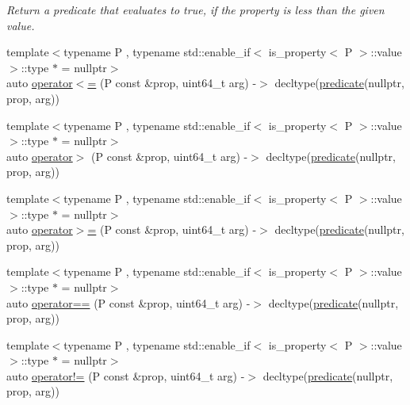 \begin{DoxyCompactItemize}
\begin{DoxyCompactList}\small\item\em Return a predicate that evaluates to {\ttfamily true}, if the property is less than the given value. \end{DoxyCompactList}\item 
{\footnotesize template$<$typename P , typename std\+::enable\+\_\+if$<$ is\+\_\+property$<$ P $>$\+::value $>$\+::type $\ast$  = nullptr$>$ }\\auto \hyperlink{namespacepfq_1_1lang_a039a937311f139f9a6e84c49c6505c70}{operator$<$=} (P const \&prop, uint64\+\_\+t arg) -\/$>$ decltype(\hyperlink{namespacepfq_1_1lang_aca9adafc436b7f851621b979fa1aaf88}{predicate}(nullptr, prop, arg))
\item 
{\footnotesize template$<$typename P , typename std\+::enable\+\_\+if$<$ is\+\_\+property$<$ P $>$\+::value $>$\+::type $\ast$  = nullptr$>$ }\\auto \hyperlink{namespacepfq_1_1lang_a708ca1f29e8dd2461859c46369e89322}{operator$>$} (P const \&prop, uint64\+\_\+t arg) -\/$>$ decltype(\hyperlink{namespacepfq_1_1lang_aca9adafc436b7f851621b979fa1aaf88}{predicate}(nullptr, prop, arg))
\item 
{\footnotesize template$<$typename P , typename std\+::enable\+\_\+if$<$ is\+\_\+property$<$ P $>$\+::value $>$\+::type $\ast$  = nullptr$>$ }\\auto \hyperlink{namespacepfq_1_1lang_a8278e1cf39622e9eb4859f4720da1d16}{operator$>$=} (P const \&prop, uint64\+\_\+t arg) -\/$>$ decltype(\hyperlink{namespacepfq_1_1lang_aca9adafc436b7f851621b979fa1aaf88}{predicate}(nullptr, prop, arg))
\item 
{\footnotesize template$<$typename P , typename std\+::enable\+\_\+if$<$ is\+\_\+property$<$ P $>$\+::value $>$\+::type $\ast$  = nullptr$>$ }\\auto \hyperlink{namespacepfq_1_1lang_a87c8fa322873efdbddaa437f194b72b0}{operator==} (P const \&prop, uint64\+\_\+t arg) -\/$>$ decltype(\hyperlink{namespacepfq_1_1lang_aca9adafc436b7f851621b979fa1aaf88}{predicate}(nullptr, prop, arg))
\item 
{\footnotesize template$<$typename P , typename std\+::enable\+\_\+if$<$ is\+\_\+property$<$ P $>$\+::value $>$\+::type $\ast$  = nullptr$>$ }\\auto \hyperlink{namespacepfq_1_1lang_a4943eabefcfed4198394f42f913a14e8}{operator!=} (P const \&prop, uint64\+\_\+t arg) -\/$>$ decltype(\hyperlink{namespacepfq_1_1lang_aca9adafc436b7f851621b979fa1aaf88}{predicate}(nullptr, prop, arg))

\end{DoxyCompactItemize}
